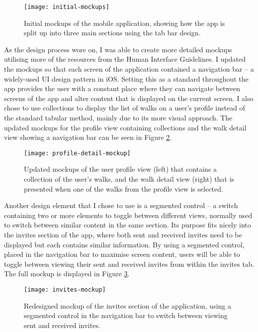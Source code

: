 \begin{figure}[hbt]
  \centering
  \texttt{[image: initial-mockups]}
  \caption{Initial mockups of the mobile application, showing how the app is split up into three main sections using the tab bar design.}
  \label{fig:initial-mockups}
\end{figure}

As the design process wore on, I was able to create more detailed mockups utilising more of the resources from the Human Interface Guidelines. I updated the mockups so that each screen of the application contained a navigation bar -- a widely-used UI design pattern in iOS. Setting this as a standard throughout the app provides the user with a constant place where they can navigate between screens of the app and alter content that is displayed on the current screen. I also chose to use collections to display the list of walks on a user's profile instead of the standard tabular method, mainly due to its more visual approach. The updated mockups for the profile view containing collections and the walk detail view showing a navigation bar can be seen in Figure \ref{fig:profile-detail-mockup}.

\begin{figure}[hbt]
  \centering
  \texttt{[image: profile-detail-mockup]}
  \caption{Updated mockups of the user profile view (left) that contains a collection of the user's walks, and the walk detail view (right) that is presented when one of the walks from the profile view is selected.}
  \label{fig:profile-detail-mockup}
\end{figure}

Another design element that I chose to use is a segmented control -- a switch containing two or more elements to toggle between different views, normally used to switch between similar content in the same section. Its purpose fits nicely into the invites section of the app, where both sent and received invites need to be displayed but each contains similar information. By using a segmented control, placed in the navigation bar to maximise screen content, users will be able to toggle between viewing their sent and received invites from within the invites tab. The full mockup is displayed in Figure \ref{fig:invites-mockup}.

\begin{figure}[hbt]
  \centering
  \texttt{[image: invites-mockup]}
  \caption{Redesigned mockup of the invites section of the application, using a segmented control in the navigation bar to switch between viewing sent and received invites.}
  \label{fig:invites-mockup}
\end{figure}

